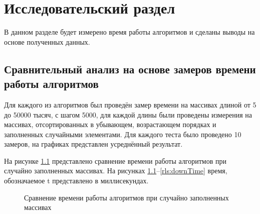\chapter{Исследовательский раздел}
\label{cha:research}
В данном разделе будет измерено время работы алгоритмов и сделаны выводы на основе полученных данных.
\section{Сравнительный анализ на основе замеров времени работы алгоритмов}
Для каждого из алгоритмов был проведён замер времени на массивах длиной от 5 до 50000 тысяч, с шагом 5000, для каждой длины были проведены измерения на массивах, отсортированных в убывающем, возрастающем порядках и заполненных случайными элементами. Для каждого теста было проведено 10 замеров, на графиках представлен усреднённый результат.
\par На рисунке \ref{rls:randomTime} представлено сравнение времени работы алгоритмов при случайно заполненных массивах. На рисунках \ref{rls:randomTime}--\ref{rls:downTime} время, обозначаемое t представлено в миллисекундах.
\begin{figure}[H]
    \centering
    \caption{Сравнение времени работы алгоритмов при случайно заполненных массивах}
    \label{rls:randomTime}
\end{figure}

